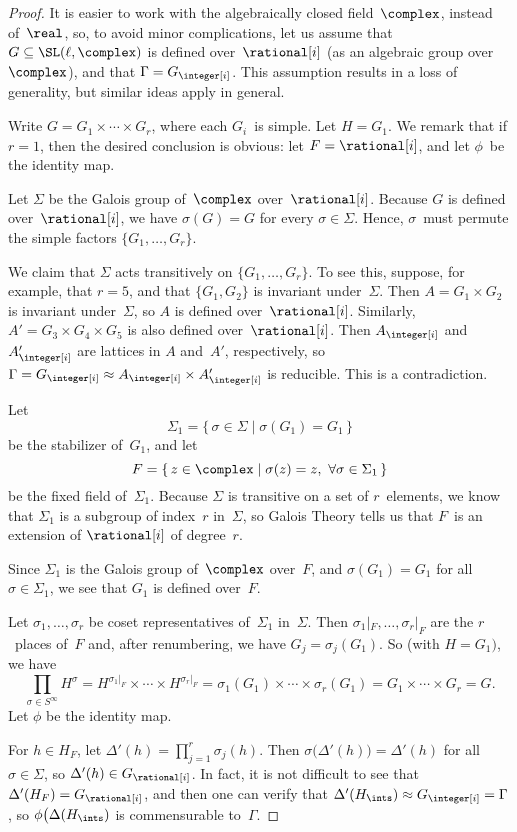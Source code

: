 \begin{proof} 
 It is easier to work with the algebraically closed
field~$\complex$, instead of~$\real$, so, to avoid minor
complications, let us assume that $G \subseteq \SL(\ell,
\complex)$ is defined over~$\rational[i]$ (as an algebraic
group over~$\complex$), and that $\Gamma = G_{\integer[i]}$.
This assumption results in a loss of generality, but similar
ideas apply in general.

Write $G = G_1 \times \cdots \times G_r$, where each
$G_i$~is simple. Let $H = G_1$. We remark that if $r = 1$,
then the desired conclusion is obvious: let $F =
\rational[i]$, and let $\phi$~be the identity map.

Let $\Sigma$ be the Galois group of~$\complex$
over~$\rational[i]$. Because $G$ is defined
over~$\rational[i]$, we have $\sigma(G) = G$ for every
$\sigma \in \Sigma$. Hence, $\sigma$~must permute the simple
factors $\{G_1,\ldots,G_r\}$. 

We claim that $\Sigma$ acts transitively on
$\{G_1,\ldots,G_r\}$. To see this, suppose, for example,
that $r = 5$, and that $\{G_1,G_2\}$ is invariant
under~$\Sigma$. Then $A = G_1 \times G_2$ is invariant
under~$\Sigma$, so $A$ is defined
over~$\rational[i]$. Similarly, $A' = G_3 \times G_4 \times
G_5$ is also defined over~$\rational[i]$. Then
$A_{\integer[i]}$ and $A'_{\integer[i]}$ are lattices in $A$
and~$A'$, respectively, so $\Gamma = G_{\integer[i]} \approx
A_{\integer[i]} \times A'_{\integer[i]}$ is reducible. This
is a contradiction.

Let
 $$ \Sigma_1 = \{\, \sigma \in \Sigma \mid \sigma(G_1) = G_1
\,\}$$
 be the stabilizer of~$G_1$, and let
 $$ F = \{\, z \in \complex \mid \sigma(z) = z, \ \forall
\sigma \in \Sigma_1 \,\} $$
 be the fixed field of~$\Sigma_1$. Because $\Sigma$ is
transitive on a set of $r$~elements, we know that $\Sigma_1$
is a subgroup of index~$r$ in~$\Sigma$, so Galois Theory
tells us that $F$~is an extension of $\rational[i]$ of
degree~$r$.

Since $\Sigma_1$ is the Galois group of~$\complex$ over~$F$,
and $\sigma(G_1) = G_1$ for all $\sigma \in \Sigma_1$, we see
that $G_1$ is defined over~$F$. 

Let $\sigma_1,\ldots,\sigma_r$ be coset representatives
of~$\Sigma_1$ in~$\Sigma$. Then $\sigma_1|_F, \ldots,
\sigma_r|_F$ are the $r$~places of~$F$ and, after
renumbering, we have $G_j = \sigma_j(G_1)$.
So (with $H = G_1)$, we have
 $$\prod_{\sigma \in S^\infty} H^\sigma
 = H^{\sigma_1|_F} \times \cdots \times H^{\sigma_r|_F}
 = \sigma_1(G_1) \times \cdots \times \sigma_r(G_1)
 = G_1 \times \cdots \times G_r
 = G .$$
 Let $\phi$ be the identity map.

For $h \in H_F$, let $\Delta'(h) = \prod_{j=1}^r
\sigma_j(h)$. Then $\sigma \bigl( \Delta'(h) \bigr) =
\Delta'(h)$ for all $\sigma \in \Sigma$, so $\Delta'(h) \in
G_{\rational[i]}$. In fact, it is not difficult
to see that $\Delta'(H_F) = G_{\rational[i]}$, and then one
can verify that
 $\Delta'(H_{\ints}) \approx G_{\integer[i]} =
\Gamma$, so $\phi \bigl( \Delta(H_{\ints})$ is
commensurable to~$\Gamma$.
 \end{proof}

